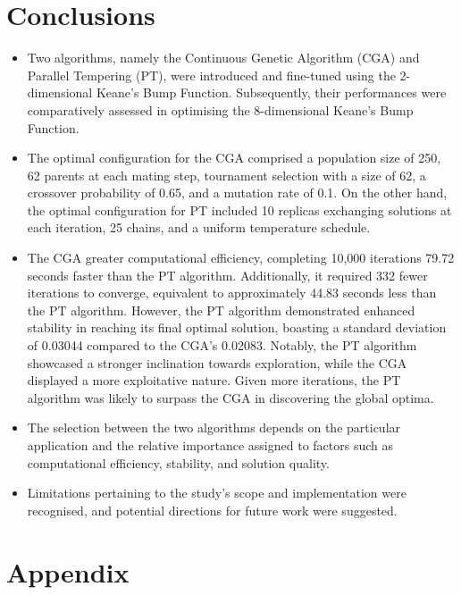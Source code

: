\documentclass[10pt]{article}
\begin{document}
\section{Conclusions}
\begin{itemize}
    \item Two algorithms, namely the Continuous Genetic Algorithm (CGA) and Parallel Tempering (PT), were introduced and fine-tuned using the 2-dimensional Keane's Bump Function. Subsequently, their performances were comparatively assessed in optimising the 8-dimensional Keane's Bump Function.
    \item The optimal configuration for the CGA comprised a population size of 250, 62 parents at each mating step, tournament selection with a size of 62, a crossover probability of 0.65, and a mutation rate of 0.1. On the other hand, the optimal configuration for PT included 10 replicas exchanging solutions at each iteration, 25 chains, and a uniform temperature schedule.
    \item The CGA greater computational efficiency, completing 10,000 iterations 79.72 seconds faster than the PT algorithm. Additionally, it required 332 fewer iterations to converge, equivalent to approximately 44.83 seconds less than the PT algorithm. However, the PT algorithm demonstrated enhanced stability in reaching its final optimal solution, boasting a standard deviation of 0.03044 compared to the CGA's 0.02083. Notably, the PT algorithm showcased a stronger inclination towards exploration, while the CGA displayed a more exploitative nature. Given more iterations, the PT algorithm was likely to surpass the CGA in discovering the global optima.
    \item The selection between the two algorithms depends on the particular application and the relative importance assigned to factors such as computational efficiency, stability, and solution quality.
    \item Limitations pertaining to the study's scope and implementation were recognised, and potential directions for future work were suggested.
\end{itemize}

\newpage
\section{Appendix}
\end{document}
